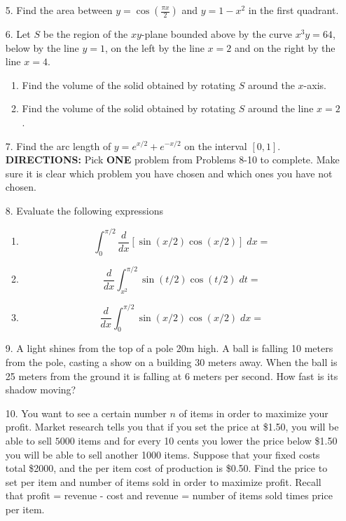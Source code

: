 \documentclass[11pt,reqno]{article}
\theoremstyle{definition}
\begin{document}
\begin{enumerate}
\begin{enumerate}
		\end{enumerate}
		\newpage
		\item[5.] Find the area between $y = \cos\left(\frac{\pi x}{2}\right)$ and $y = 1 - x^2$ in the first quadrant. 
		\newpage
		\item[6.] Let $S$ be the region of the $xy$-plane bounded above by the curve $x^3y = 64$, below by the line $y = 1$, on the left by the line $x = 2$ and on the right by the line $x = 4$. 
		\begin{enumerate}
			\item Find the volume of the solid obtained by rotating $S$ around the $x$-axis. 
			\vspace{8cm}
			\item Find the volume of the solid obtained by rotating $S$ around the line $x = 2$. 
		\end{enumerate}
		\newpage
		\item[7.] Find the arc length of $y = e^{x/2} + e^{-x/2}$ on the interval $[0, 1]$. 
		\newpage
		\textbf{DIRECTIONS:} Pick \textbf{ONE} problem from Problems 8-10 to complete. Make sure it is clear which problem you have chosen and which ones you have not chosen. 
		\item[8.] Evaluate the following expressions
		\begin{enumerate}
			\item $$\int_{0}^{\pi/2} \frac{d}{dx}[\sin(x/2)\cos(x/2)] \; dx = $$ 
			\vspace{2in}
			\item $$ \frac{d}{dx} \int_{x^2}^{\pi/2} \sin(t/2)\cos(t/2) \; dt = $$ 
			\vspace{2in} \item $$\frac{d}{dx} \int_{0}^{\pi/2} \sin(x/2)\cos(x/2) \; dx = $$
		\end{enumerate}
		\newpage
		\item[9.] A light shines from the top of a pole 20m high. A ball is falling 10 meters from the pole, casting a show on a building 30 meters away. When the ball is 25 meters from the ground it is falling at 6 meters per second. How fast is its shadow moving? 
		\newpage
		\item[10.] 	You want to see a certain number $n$ of items in order to maximize your profit. Market research tells you that if you set the price at \$1.50, you will be able to sell $5000$ items and for every 10 cents you lower the price below \$1.50 you will be able to sell another 1000 items. Suppose that your fixed costs total \$2000, and the per item cost of production is \$0.50. Find the price to set per item and number of items sold in order to maximize profit. Recall that profit = revenue - cost and revenue = number of items sold times price per item.
	
	\end{enumerate}
	
	
\end{document}
